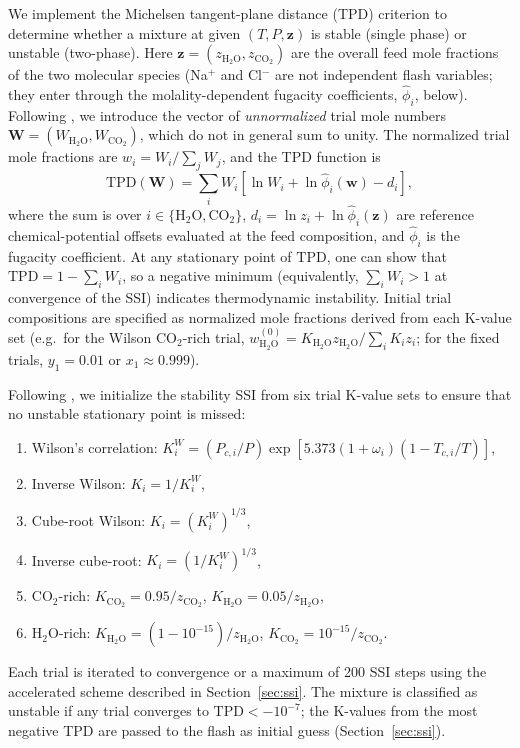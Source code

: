 \documentclass[preprint,12pt,authoryear]{elsarticle}
\begin{document}
We implement the Michelsen tangent-plane distance (TPD) criterion \citep{Michelsen1982a}
to determine whether a mixture at given $(T, P, \mathbf{z})$ is stable (single phase) or
unstable (two-phase).
Here $\mathbf{z} = (z_{\text{H}_2\text{O}}, z_{\text{CO}_2})$ are the overall feed mole
fractions of the two molecular species (Na$^+$ and Cl$^-$ are not independent flash
variables; they enter through the molality-dependent fugacity coefficients,  $\hat{\phi}_i$, below).
Following \citet{Michelsen1982a}, we introduce the vector of
\emph{unnormalized} trial mole numbers
$\mathbf{W} = (W_{\text{H}_2\text{O}}, W_{\text{CO}_2})$, which do not
in general sum to unity.
The normalized trial mole fractions are $w_i = W_i / \sum_j W_j$, and
the TPD function is
\begin{equation}
  \text{TPD}(\mathbf{W}) = \sum_{i} W_i \left[\ln W_i + \ln \hat{\phi}_i(\mathbf{w}) - d_i\right],
  \label{eq:tpd}
\end{equation}
where the sum is over $i \in \{\text{H}_2\text{O}, \text{CO}_2\}$,
$d_i = \ln z_i + \ln \hat{\phi}_i(\mathbf{z})$ are reference chemical-potential
offsets evaluated at the feed composition, and $\hat{\phi}_i$ is the fugacity
coefficient.
At any stationary point of $\text{TPD}$, one can show that
$\text{TPD} = 1 - \sum_i W_i$, so a negative minimum
(equivalently, $\sum_i W_i > 1$ at convergence of the SSI) indicates
thermodynamic instability.
Initial trial compositions are specified as normalized mole fractions derived
from each K-value set (e.g.\ for the Wilson CO$_2$-rich trial,
$w_{\text{H}_2\text{O}}^{(0)} = K_{\text{H}_2\text{O}}z_{\text{H}_2\text{O}} /
\sum_i K_i z_i$; for the fixed trials, $y_1 = 0.01$ or
$x_1 \approx 0.999$).

Following \citet{Jex2024}, we initialize the stability SSI from six trial K-value sets to
ensure that no unstable stationary point is missed:
\begin{enumerate}
  \item Wilson's correlation: $K_i^W = (P_{c,i}/P)\exp[5.373(1+\omega_i)(1-T_{c,i}/T)]$,
  \item Inverse Wilson: $K_i = 1/K_i^W$,
  \item Cube-root Wilson: $K_i = (K_i^W)^{1/3}$,
  \item Inverse cube-root: $K_i = (1/K_i^W)^{1/3}$,
  \item CO$_2$-rich: $K_{\text{CO}_2} = 0.95/z_{\text{CO}_2}$,
        $K_{\text{H}_2\text{O}} = 0.05/z_{\text{H}_2\text{O}}$,
  \item H$_2$O-rich: $K_{\text{H}_2\text{O}} = (1-10^{-15})/z_{\text{H}_2\text{O}}$,
        $K_{\text{CO}_2} = 10^{-15}/z_{\text{CO}_2}$.
\end{enumerate}
Each trial is iterated to convergence or a maximum of 200 SSI steps using the
accelerated scheme described in Section~\ref{sec:ssi}.
The mixture is classified as unstable if any trial converges to
$\text{TPD} < -10^{-7}$; the K-values from the most negative TPD are
passed to the flash as initial guess (Section~\ref{sec:ssi}).
\end{document}
